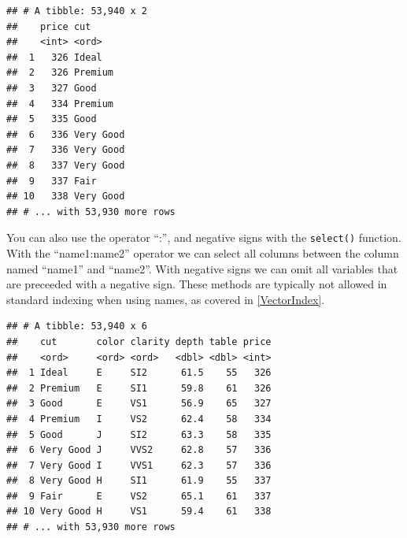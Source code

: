 \documentclass[
]{book}
\newenvironment{Shaded}{\begin{snugshade}}{\end{snugshade}}
\newcommand{\CommentTok}[1]{\textcolor[rgb]{0.56,0.35,0.01}{\textit{#1}}}
\newcommand{\KeywordTok}[1]{\textcolor[rgb]{0.13,0.29,0.53}{\textbf{#1}}}
\newcommand{\NormalTok}[1]{#1}
\newcommand{\OperatorTok}[1]{\textcolor[rgb]{0.81,0.36,0.00}{\textbf{#1}}}
\newcommand{\StringTok}[1]{\textcolor[rgb]{0.31,0.60,0.02}{#1}}
\begin{document}
\begin{verbatim}
## # A tibble: 53,940 x 2
##    price cut      
##    <int> <ord>    
##  1   326 Ideal    
##  2   326 Premium  
##  3   327 Good     
##  4   334 Premium  
##  5   335 Good     
##  6   336 Very Good
##  7   336 Very Good
##  8   337 Very Good
##  9   337 Fair     
## 10   338 Very Good
## # ... with 53,930 more rows
\end{verbatim}

You can also use the operator ``:'', and negative signs with the \texttt{select()} function. With the ``name1:name2'' operator we can select all columns between the column named ``name1'' and ``name2''. With negative signs we can omit all variables that are preceeded with a negative sign. These methods are typically not allowed in standard indexing when using names, as covered in \ref{VectorIndex}.

\begin{Shaded}
\end{Shaded}

\begin{verbatim}
## # A tibble: 53,940 x 6
##    cut       color clarity depth table price
##    <ord>     <ord> <ord>   <dbl> <dbl> <int>
##  1 Ideal     E     SI2      61.5    55   326
##  2 Premium   E     SI1      59.8    61   326
##  3 Good      E     VS1      56.9    65   327
##  4 Premium   I     VS2      62.4    58   334
##  5 Good      J     SI2      63.3    58   335
##  6 Very Good J     VVS2     62.8    57   336
##  7 Very Good I     VVS1     62.3    57   336
##  8 Very Good H     SI1      61.9    55   337
##  9 Fair      E     VS2      65.1    61   337
## 10 Very Good H     VS1      59.4    61   338
## # ... with 53,930 more rows
\end{verbatim}

\begin{Shaded}
\end{Shaded}
\end{document}
